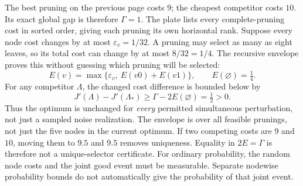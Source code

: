 The best pruning on the previous page costs $9$; the cheapest competitor costs $10$. Its exact global gap is therefore $\Gamma=1$. The plate lists every complete-pruning cost in sorted order, giving each pruning its own horizontal rank.
Suppose every node cost changes by at most $\varepsilon_v=1/32$. A pruning may select as many as eight leaves, so its total cost can change by at most $8/32=1/4$. The recursive envelope proves this without guessing which pruning will be selected:
\[
E(v)=\max\{\varepsilon_v,\ E(v0)+E(v1)\},\qquad E(\varnothing)=\tfrac14.
\]
For any competitor $\Lambda$, the changed cost difference is bounded below by
\[
J'(\Lambda)-J'(\Lambda_*)\ge \Gamma-2E(\varnothing)=\tfrac12>0.
\]
Thus the optimum is unchanged for \emph{every} permitted simultaneous perturbation, not just a sampled noise realization. The envelope is over all feasible prunings, not just the five nodes in the current optimum.
If two competing costs are $9$ and $10$, moving them to $9.5$ and $9.5$ removes uniqueness. Equality in $2E=\Gamma$ is therefore not a unique-selector certificate. For ordinary probability, the random node costs and the joint good event must be measurable. Separate nodewise probability bounds do not automatically give the probability of that joint event.

